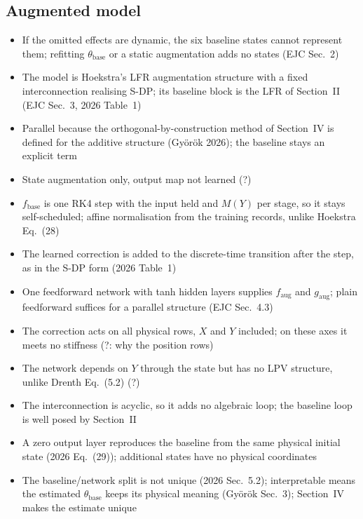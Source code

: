 \subsection{Augmented model}\label{sec:aug_structure}
\ifdraft
\begin{itemize}
\item If the omitted effects are dynamic, the six baseline states cannot represent them; refitting $\theta_{\mathrm{base}}$ or a static augmentation adds no states (EJC Sec.~2)
\item The model is Hoekstra's LFR augmentation structure with a fixed interconnection realising S-DP; its baseline block is the LFR of Section~II (EJC Sec.~3, 2026 Table~1)
\item Parallel because the orthogonal-by-construction method of Section~IV is defined for the additive structure (Gy\"or\"ok 2026); the baseline stays an explicit term
\item State augmentation only, output map not learned (?)
\item $f_{\mathrm{base}}$ is one RK4 step with the input held and $M(Y)$ per stage, so it stays self-scheduled; affine normalisation from the training records, unlike Hoekstra Eq.~(28)
\item The learned correction is added to the discrete-time transition after the step, as in the S-DP form (2026 Table~1)
\item One feedforward network with tanh hidden layers supplies $f_{\mathrm{aug}}$ and $g_{\mathrm{aug}}$; plain feedforward suffices for a parallel structure (EJC Sec.~4.3)
\item The correction acts on all physical rows, $X$ and $Y$ included; on these axes it meets no stiffness (?: why the position rows)
\item The network depends on $Y$ through the state but has no LPV structure, unlike Drenth Eq.~(5.2) (?)
\item The interconnection is acyclic, so it adds no algebraic loop; the baseline loop is well posed by Section~II
\item A zero output layer reproduces the baseline from the same physical initial state (2026 Eq.~(29)); additional states have no physical coordinates
\item The baseline/network split is not unique (2026 Sec.~5.2); interpretable means the estimated $\theta_{\mathrm{base}}$ keeps its physical meaning (Gy\"or\"ok Sec.~3); Section~IV makes the estimate unique
\end{itemize}
\fi

